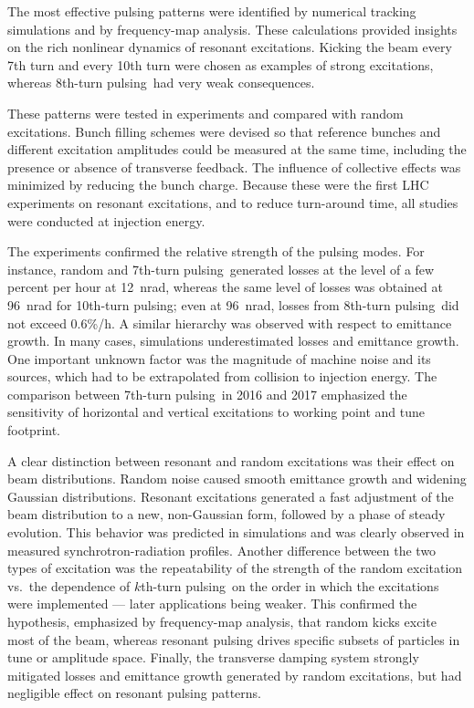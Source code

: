 \documentclass[
prstab
,reprint
,linenumbers
,longbibliography
,preprintnumbers
,showkeys
,amsfonts,amssymb,amsmath
,floatfix
]{revtex4-1}
\newcommand{\kthtp}{$k$th-turn pulsing}
\newcommand{\seventhtp}{7th-turn pulsing}
\newcommand{\eighthtp}{8th-turn pulsing}
\newcommand{\tenthtp}{10th-turn pulsing}
\begin{document}
The most effective pulsing patterns were identified by numerical
tracking simulations and by frequency-map analysis. These calculations
provided insights on the rich nonlinear dynamics of resonant
excitations. Kicking the beam every 7th turn and every 10th turn were
chosen as examples of strong excitations, whereas \eighthtp\ had very
weak consequences.

These patterns were tested in experiments and compared with random
excitations. Bunch filling schemes were devised so that reference
bunches and different excitation amplitudes could be measured at the
same time, including the presence or absence of transverse
feedback. The influence of collective effects was minimized by
reducing the bunch charge. Because these were the first LHC
experiments on resonant excitations, and to reduce turn-around time,
all studies were conducted at injection energy.

The experiments confirmed the relative strength of the pulsing
modes. For instance, random and \seventhtp\ generated losses at the
level of a few percent per hour at 12~nrad, whereas the same level of
losses was obtained at 96~nrad for \tenthtp; even at 96~nrad, losses
from \eighthtp\ did not exceed 0.6\%/h. A similar hierarchy was
observed with respect to emittance growth. In many cases, simulations
underestimated losses and emittance growth. One important unknown
factor was the magnitude of machine noise and its sources, which had
to be extrapolated from collision to injection energy. The comparison
between \seventhtp\ in 2016 and 2017 emphasized the sensitivity of
horizontal and vertical excitations to working point and tune
footprint.

A clear distinction between resonant and random excitations was their
effect on beam distributions. Random noise caused smooth emittance
growth and widening Gaussian distributions. Resonant excitations
generated a fast adjustment of the beam distribution to a new,
non-Gaussian form, followed by a phase of steady evolution. This
behavior was predicted in simulations and was clearly observed in
measured synchrotron-radiation profiles. Another difference between
the two types of excitation was the repeatability of the strength of
the random excitation vs.\ the dependence of \kthtp\ on the order in
which the excitations were implemented --- later applications being
weaker. This confirmed the hypothesis, emphasized by frequency-map
analysis, that random kicks excite most of the beam, whereas resonant
pulsing drives specific subsets of particles in tune or amplitude
space. Finally, the transverse damping system strongly mitigated
losses and emittance growth generated by random excitations, but had
negligible effect on resonant pulsing patterns.
\end{document}
